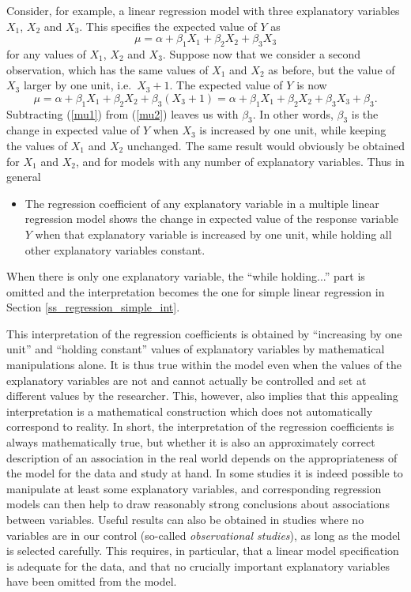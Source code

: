 Consider, for example, a linear regression model with three explanatory
variables $X_{1}$, $X_{2}$ and $X_{3}$. This specifies the expected
value of $Y$ as
\begin{equation}
\mu=\alpha+\beta_{1}X_{1}+\beta_{2}X_{2}+\beta_{3}X_{3}
\label{mu1}
\end{equation}
for any values of $X_{1}$, $X_{2}$ and $X_{3}$. Suppose now that
we consider a
second observation, which has the same values of $X_{1}$ and $X_{2}$ as
before, but the value of $X_{3}$ larger by one unit, i.e.\ $X_{3}+1$. The
expected value of $Y$ is now
\begin{equation}
\mu=\alpha+\beta_{1}X_{1}+\beta_{2}X_{2}+\beta_{3}(X_{3}+1)=
\alpha+\beta_{1}X_{1}+\beta_{2}X_{2}+\beta_{3}X_{3}+\beta_{3}.
\label{mu2}
\end{equation}
Subtracting (\ref{mu1}) from (\ref{mu2}) leaves us with $\beta_{3}$. In
other words, $\beta_{3}$ is the change in expected value of $Y$ when
$X_{3}$ is increased by one unit, while keeping the values of $X_{1}$
and $X_{2}$ unchanged. The same result would obviously be obtained for
$X_{1}$ and $X_{2}$, and for models with any number of explanatory
variables. Thus in general
\begin{itemize}
\item
The regression coefficient of any explanatory variable in a multiple
linear regression model shows the change in expected value of the
response variable $Y$ when that explanatory variable is increased by one
unit, while holding all other explanatory variables constant.
\end{itemize}
When there is only one explanatory variable, the ``while holding...''
part is omitted and the interpretation becomes the one
for simple linear regression in Section
\ref{ss_regression_simple_int}.

This interpretation of the regression coefficients is obtained by
``increasing by one unit'' and ``holding constant'' values of
explanatory variables by mathematical manipulations alone. It is thus
true within the model even when the values of the explanatory variables
are not and cannot actually be controlled and set at different values by
the researcher. This, however, also implies that this appealing
interpretation is a mathematical construction which does not
automatically correspond to reality. In short, the interpretation of the
regression coefficients is always mathematically true, but whether it is
also an approximately correct description of an association in the real
world depends on the appropriateness of the model for the data and study
at hand. In some studies it is indeed possible to manipulate at least
some explanatory variables,  and corresponding regression models can
then help to draw reasonably strong conclusions about associations
between variables. Useful results can also be obtained in studies where
no variables are in our control (so-called \emph{observational
studies}), as long as the model is selected carefully. This requires, in
particular, that a linear model specification is adequate for the data,
and that no crucially important explanatory variables have been omitted
from the model.

